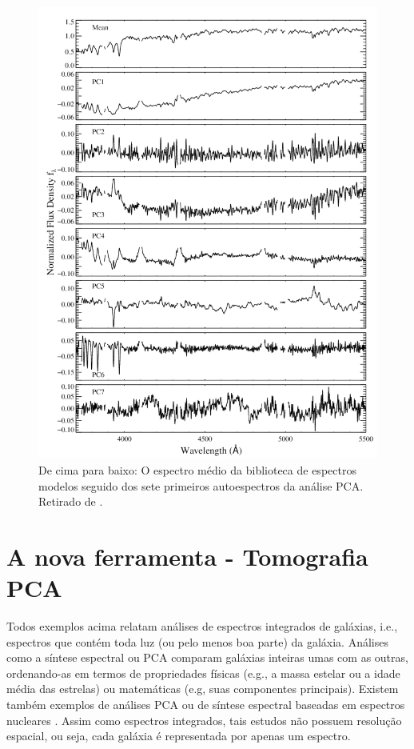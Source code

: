 \begin{figure}
    \includegraphics[height=1.\textwidth]{figuras/figChen2012fig2.pdf}
    \caption[Espectro médio e 7 primeiras PCs de uma biblioteca de modelos.]
    {De cima para baixo: O espectro médio da biblioteca de espectros modelos seguido dos sete primeiros autoespectros
    da análise PCA. Retirado de \citet{Chen2012}.}
    \label{fig:Chen2012fig2}
\end{figure}

\section{A nova ferramenta - Tomografia PCA}
\label{sec:Intro:TomoPCA}

Todos exemplos acima relatam análises de espectros integrados de galáxias, i.e., espectros que contém toda luz (ou pelo
menos boa parte) da galáxia. Análises como a síntese espectral ou PCA comparam galáxias inteiras umas com as outras,
ordenando-as em termos de propriedades físicas (e.g., a massa estelar ou a idade média das estrelas) ou matemáticas
(e.g, suas componentes principais). Existem também exemplos de análises PCA ou de síntese espectral baseadas em
espectros nucleares \citep[e.g., ][]{Trager2000I, CidFernandes2004}. Assim como espectros integrados, tais estudos não
possuem resolução espacial, ou seja, cada galáxia é representada por apenas um espectro.

